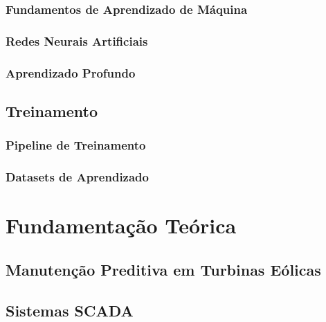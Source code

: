 \documentclass[12pt,a4paper]{article}
\begin{document}
\subsubsection{Fundamentos de Aprendizado de Máquina}

\subsubsection{Redes Neurais Artificiais}

\subsubsection{Aprendizado Profundo}

\subsection{Treinamento}

\subsubsection{Pipeline de Treinamento}

\subsubsection{Datasets de Aprendizado}

\section{Fundamentação Teórica}

\subsection{Manutenção Preditiva em Turbinas Eólicas}

\subsection{Sistemas SCADA}
\end{document}
